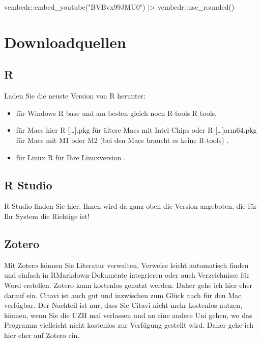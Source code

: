 \documentclass[twoside, pagesize, fontsize=11pt, dvipsnames]{scrreport}
\newenvironment{Shaded}{\begin{snugshade}}{\end{snugshade}}
\newcommand{\FunctionTok}[1]{\textcolor[rgb]{0.28,0.35,0.67}{#1}}
\newcommand{\NormalTok}[1]{\textcolor[rgb]{0.00,0.23,0.31}{#1}}
\newcommand{\SpecialCharTok}[1]{\textcolor[rgb]{0.37,0.37,0.37}{#1}}
\newcommand{\StringTok}[1]{\textcolor[rgb]{0.13,0.47,0.30}{#1}}
\begin{document}
\begin{Shaded}
\begin{Highlighting}[]
\NormalTok{vembedr}\SpecialCharTok{::}\FunctionTok{embed\_youtube}\NormalTok{(}\StringTok{"BVBvx99JMU0"}\NormalTok{) }\SpecialCharTok{|\textgreater{}}
\NormalTok{  vembedr}\SpecialCharTok{::}\FunctionTok{use\_rounded}\NormalTok{()}
\end{Highlighting}
\end{Shaded}

\hypertarget{downloadquellen}{%
\section{Downloadquellen}\label{downloadquellen}}

\hypertarget{r}{%
\subsection{R}\label{r}}

Laden Sie die neuste Version von R herunter:

\begin{itemize}
\item
  für Windows R base und am besten gleich noch R-tools R tools.
\item
  für Macs hier R-{[}\ldots{]}.pkg für ältere Macs mit Intel-Chips oder
  R-{[}\ldots{]}arm64.pkg für Macs mit M1 oder M2 (bei den Macs braucht
  es keine R-tools) .
\item
  für Linux R für Ihre Linuxversion .
\end{itemize}

\hypertarget{r-studio}{%
\subsection{R Studio}\label{r-studio}}

R-Studio finden Sie hier. Ihnen wird da ganz oben die Version angeboten,
die für Ihr System die Richtige ist!

\hypertarget{zotero}{%
\subsection{Zotero}\label{zotero}}

Mit Zotero können Sie Literatur verwalten, Verweise leicht automatisch
finden und einfach in RMarkdown-Dokumente integrieren oder auch
Verzeichnisse für Word erstellen. Zotero kann kostenlos genutzt werden.
Daher gehe ich hier eher darauf ein. Citavi ist auch gut und inzwischen
zum Glück auch für den Mac verfügbar. Der Nachteil ist nur, dass Sie
Citavi nicht mehr kostenlos nutzen, können, wenn Sie die UZH mal
verlassen und an eine andere Uni gehen, wo das Programm vielleicht nicht
kostenlos zur Verfügung gestellt wird. Daher gehe ich hier eher auf
Zotero ein.
\end{document}
